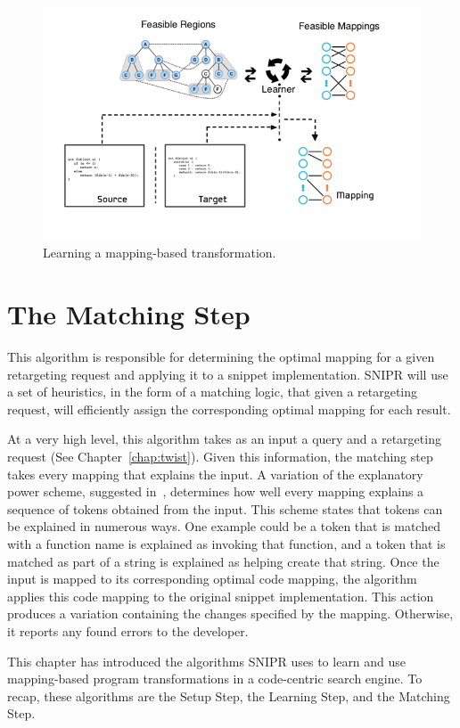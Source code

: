 \begin{figure}[!ht]
    \centering
    \includegraphics[width=\textwidth]{images/mappinggeneration}
    \caption{Learning a mapping-based transformation.}
    \label{fig:mappinggeneration}
\end{figure}

\section{The Matching Step}
\label{sec:matching}

This algorithm is responsible for determining the optimal mapping for a given retargeting request and applying it to a snippet implementation. \uppercase{SNIPR} will use a set of heuristics, in the form of a matching logic, that given a retargeting request, will efficiently assign the corresponding optimal mapping for each result. 

At a very high level, this algorithm takes as an input a query and a retargeting request (See Chapter~\ref{chap:twist}). Given this information, the matching step takes every mapping that explains the input. A variation of the explanatory power scheme, suggested in~\cite{Little:2008hr}, determines how well every mapping explains a sequence of tokens obtained from the input. This scheme states that tokens can be explained in numerous ways. One example could be a token that is matched with a function name is explained as invoking that function, and a token that is matched as part of a string is explained as helping create that string. Once the input is mapped to its corresponding optimal code mapping, the algorithm applies this code mapping to the original snippet implementation. This action produces a variation containing the changes specified by the mapping. Otherwise, it reports any found errors to the developer. 

This chapter has introduced the algorithms SNIPR uses to learn and use mapping-based program transformations in a code-centric search engine. To recap, these algorithms are the Setup Step, the Learning Step, and the Matching Step.
